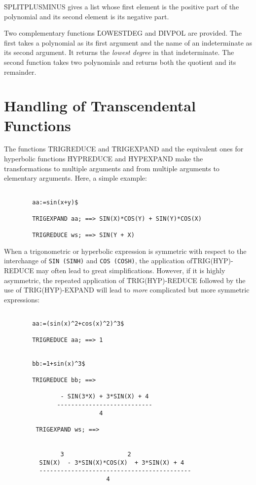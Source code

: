 \f{SPLITPLUSMINUS}  gives a list whose first element is the positive
part of the polynomial and its second element is its negative part.
\item[iii.]
Two complementary functions \f{LOWESTDEG} and \f{DIVPOL} are provided.
The first takes a polynomial as its first argument and the name of an
indeterminate as its second argument. It returns the {\em lowest degree}
 in that indeterminate. The second function takes two polynomials and
returns both the quotient and its remainder.
\ei
\section{Handling of Transcendental Functions}
The functions \f{TRIGREDUCE} and \f{TRIGEXPAND} and the equivalent
ones for hyperbolic functions \f{HYPREDUCE} and \f{HYPEXPAND}
make the transformations to multiple arguments and from
multiple arguments to elementary arguments. Here, a simple example:
\begin{verbatim}

        aa:=sin(x+y)$

        TRIGEXPAND aa; ==> SIN(X)*COS(Y) + SIN(Y)*COS(X)

        TRIGREDUCE ws; ==> SIN(Y + X)

\end{verbatim}
When a trigonometric or hyperbolic expression is symmetric with
respect to the interchange of {\tt SIN (SINH)} and {\tt COS (COSH)},
the application of\nl \f{TRIG(HYP)-REDUCE} may often lead to great
simplifications. However, if it is highly asymmetric, the repeated
application of \f{TRIG(HYP)-REDUCE} followed by the use of
\f{TRIG(HYP)-EXPAND} will lead to {\em more} complicated
but more symmetric expressions:
\begin{verbatim}

        aa:=(sin(x)^2+cos(x)^2)^3$

        TRIGREDUCE aa; ==> 1

\end{verbatim}
\pagebreak
\begin{verbatim}

        bb:=1+sin(x)^3$

        TRIGREDUCE bb; ==>

                - SIN(3*X) + 3*SIN(X) + 4
               ---------------------------
                           4

         TRIGEXPAND ws; ==>


                3                  2
          SIN(X)  - 3*SIN(X)*COS(X)  + 3*SIN(X) + 4
          -------------------------------------------
                             4

\end{verbatim}

